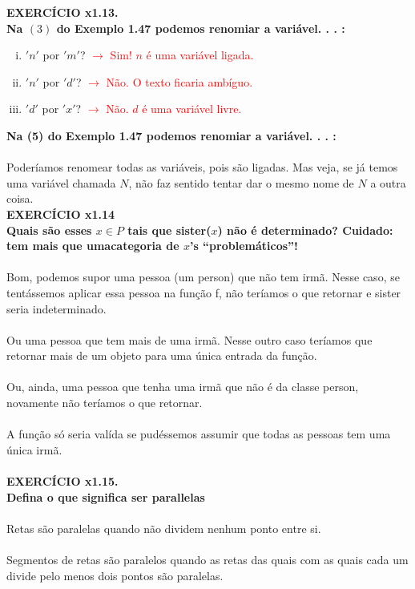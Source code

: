 \documentclass[a4paper, 12pt]{article}
\begin{document}
\noindent \textbf{EXERCÍCIO x1.13. \\
Na $(3)$ do Exemplo 1.47 podemos renomiar a variável. . . :}
\begin{enumerate}[(i)]
    \item $'n'$ por $'m'$? \textcolor{red}{$\rightarrow$ Sim! $n$ é uma variável ligada.}
    \item $'n'$ por $'d'$? \textcolor{red}{$\rightarrow$ Não. O texto ficaria ambíguo.}
    \item $'d'$ por $'x'$? \textcolor{red}{$\rightarrow$ Não. $d$ é uma variável livre.}
\end{enumerate}

\noindent \textbf{Na (5) do Exemplo 1.47 podemos renomiar a variável. . . :} \\ \\
Poderíamos renomear todas as variáveis, pois são ligadas. Mas veja, se já temos uma variável chamada $N$, não faz sentido tentar dar o mesmo nome de $N$ a outra coisa. \\

\noindent \textbf{EXERCÍCIO x1.14 \\
Quais são esses $x \in P$ tais que sister($x$) não é determinado? Cuidado: tem mais que umacategoria de $x$'s “problemáticos”!} \\ \\
Bom, podemos supor uma pessoa (um person) que não tem irmã. Nesse caso, se tentássemos aplicar essa pessoa na função f, não teríamos o que retornar e sister seria indeterminado. \\ \\
Ou uma pessoa que tem mais de uma irmã. Nesse outro caso teríamos que retornar mais de um objeto para uma única entrada da função. \\ \\
Ou, ainda, uma pessoa que tenha uma irmã que não é da classe person, novamente não teríamos o que retornar. \\ \\
A função só seria valída se pudéssemos assumir que todas as pessoas tem uma única irmã. \\ \\

\noindent \textbf{EXERCÍCIO x1.15. \\
Defina o que significa ser parallelas} \\ \\
Retas são paralelas quando não dividem nenhum ponto entre si.\\ \\
Segmentos de retas são paralelos quando as retas das quais com as quais cada um divide pelo menos dois pontos são paralelas. \\ \\
\end{document}

